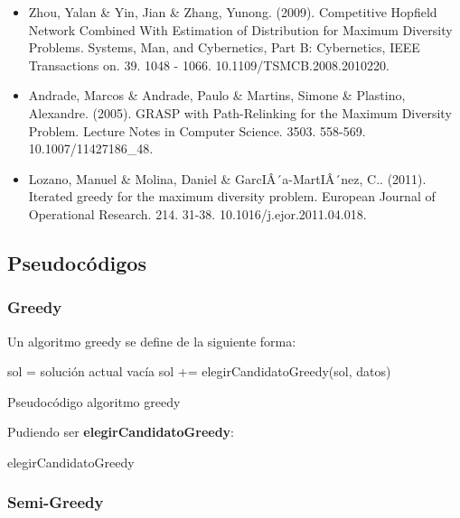 \documentclass[13pt,a4paper]{article}
\begin{document}
\begin{itemize}
    \item Zhou, Yalan \& Yin, Jian \& Zhang, Yunong. (2009). Competitive Hopfield Network Combined With Estimation of Distribution for Maximum Diversity Problems. Systems, Man, and Cybernetics, Part B: Cybernetics, IEEE Transactions on. 39. 1048 - 1066. 10.1109/TSMCB.2008.2010220. 
    \item Andrade, Marcos \& Andrade, Paulo \& Martins, Simone \& Plastino, Alexandre. (2005). GRASP with Path-Relinking for the Maximum Diversity Problem. Lecture Notes in Computer Science. 3503. 558-569. 10.1007/11427186\_48. 
    \item Lozano, Manuel \& Molina, Daniel \& GarcIÂ´a-MartIÂ´nez, C.. (2011). Iterated greedy for the maximum diversity problem. European Journal of Operational Research. 214. 31-38. 10.1016/j.ejor.2011.04.018. 
\end{itemize}

\subsection{Pseudocódigos}

\subsubsection{Greedy}

Un algoritmo greedy se define de la siguiente forma:

\begin{algorithm}[H]
    \SetAlgoLined
        sol = solución actual vacía \;
         {
            sol += elegirCandidatoGreedy(sol, datos) \;
        }        
    \caption{Pseudocódigo algoritmo greedy}
\end{algorithm}

\vspace{\baselineskip}

Pudiendo ser \textbf{elegirCandidatoGreedy}:

\begin{algorithm}[H]
    \SetAlgoLined
    \caption{elegirCandidatoGreedy}
\end{algorithm}


\subsubsection{Semi-Greedy}
\end{document}
